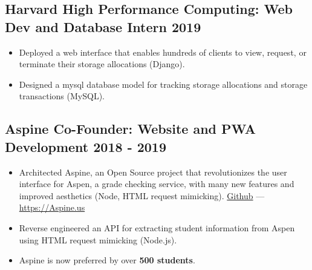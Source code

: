 \documentclass{article}
\begin{document}

\subsection{Harvard High Performance Computing: Web Dev and Database Intern \hfill 2019}
\begin{itemize}[leftmargin=0.5in]
  \setlength\itemsep{0.00em}
  \item Deployed a web interface that enables hundreds of clients to view, request, or terminate their storage allocations (Django).
  \item Designed a mysql database model for tracking storage allocations and storage transactions (MySQL).
\end{itemize}

\subsection{Aspine Co-Founder: Website and PWA Development \hfill 2018 - 2019}
\begin{itemize}[leftmargin=0.5in]
  \setlength\itemsep{0.00em}
  \item Architected Aspine, an Open Source project that revolutionizes the user interface for Aspen, a grade checking service, with many new features and improved aesthetics (Node, HTML request mimicking). \href{https://github.com/Aspine/aspine}{Github} --- \href{https://aspine.us}{https://Aspine.us}
  \item Reverse engineered an API for extracting student information from Aspen using HTML request mimicking (Node.js).
  \item Aspine is now preferred by over \textbf{500 students}.
\end{itemize}
\end{document}

